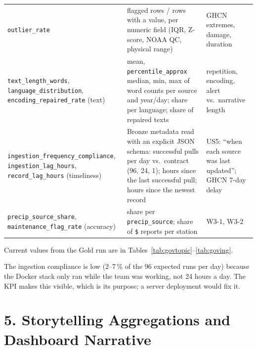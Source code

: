 \documentclass[stu, 12pt, letterpaper, donotrepeattitle, floatsintext, natbib]{apa7}
\begin{document}
{\begin{xltabular}{\textwidth}{>{\raggedright\arraybackslash}p{3.0cm} >{\raggedright\arraybackslash}p{5.6cm} >{\raggedright\arraybackslash}X}
\texttt{outlier\_rate} & flagged rows / rows with a value, per numeric field (IQR, Z-score, NOAA QC, physical range) & GHCN extremes, damage, duration \\
\texttt{text\_length\_words}, \texttt{language\_distribution}, \texttt{encoding\_repaired\_rate} (text) & mean, \texttt{percentile\_approx} median, min, max of word counts per source and year/day; share per language; share of repaired texts & repetition, encoding, alert vs.\ narrative length \\
\texttt{ingestion\_frequency\_compliance}, \texttt{ingestion\_lag\_hours}, \texttt{record\_lag\_hours} (timeliness) & Bronze metadata read with an explicit JSON schema: successful pulls per day vs.\ contract (96, 24, 1); hours since the last successful pull; hours since the newest record & US5: ``when each source was last updated''; GHCN 7-day delay \\
\texttt{precip\_source\_share}, \texttt{maintenance\_flag\_rate} (accuracy) & share per \texttt{precip\_source}; share of \texttt{\$} reports per station & W3-1, W3-2 \\
\end{xltabular}}

\noindent Current values from the Gold run are in Tables~\ref{tab:govtopic}--\ref{tab:goving}.






\noindent The ingestion compliance is low (2--7\,\% of the 96 expected runs per day) because the Docker stack only ran while the team was working, not 24 hours a day. The KPI makes this visible, which is its purpose; a server deployment would fix it.

\section{\large 5. Storytelling Aggregations and Dashboard Narrative}
\end{document}
